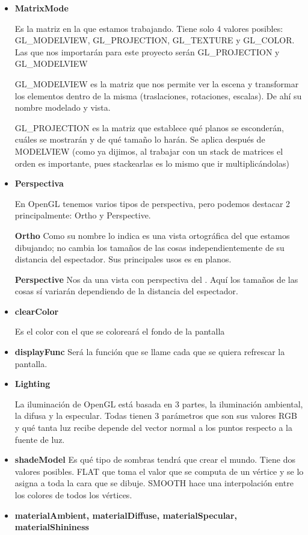 \documentclass{article}
\begin{document}
\begin{itemize}
    \item \textbf{MatrixMode}
    
    Es la matriz en la que estamos trabajando. 
    Tiene solo 4 valores posibles: GL\_MODELVIEW, GL\_PROJECTION, GL\_TEXTURE y GL\_COLOR. Las que nos importarán para este proyecto serán GL\_PROJECTION y GL\_MODELVIEW
    
    GL\_MODELVIEW es la matriz que nos permite ver la escena y transformar los elementos dentro de la misma (traslaciones, rotaciones, escalas). De ahí su nombre modelado y vista.
    
    GL\_PROJECTION es la matriz que establece qué planos se esconderán, cuáles se mostrarán y de qué tamaño lo harán. Se aplica después de MODELVIEW (como ya dijimos, al trabajar con un stack de matrices el orden es importante, pues stackearlas es lo mismo que ir multiplicándolas)
    
    \item \textbf{Perspectiva}

En OpenGL tenemos varios tipos de perspectiva, pero podemos destacar 2 principalmente: Ortho y Perspective.

\textbf{Ortho} Como su nombre lo indica es una vista ortográfica del  que estamos dibujando; no cambia los tamaños de las cosas independientemente de su distancia del espectador. Sus principales usos es en planos.

\textbf{Perspective} Nos da una vista con perspectiva del . Aquí los tamaños de las cosas sí variarán dependiendo de la distancia del espectador.

\item \textbf{clearColor}

Es el color con el que se coloreará el fondo de la pantalla

\item \textbf{displayFunc}
Será la función que se llame cada que se quiera refrescar la pantalla.

\item \textbf{Lighting}

La iluminación de OpenGL está basada en 3 partes, la iluminación ambiental, la difusa y la especular. Todas tienen 3 parámetros que son sus valores RGB y qué tanta luz recibe depende del vector normal a los puntos respecto a la fuente de luz.

\item \textbf{shadeModel}
Es qué tipo de sombras tendrá que crear el mundo. Tiene dos valores posibles. FLAT que toma el valor que se computa de un vértice y se lo asigna a toda la cara que se dibuje. SMOOTH hace una interpolación entre los colores de todos los vértices.
\item \textbf{  materialAmbient, materialDiffuse, materialSpecular, materialShininess }


\end{itemize}
\end{document}
